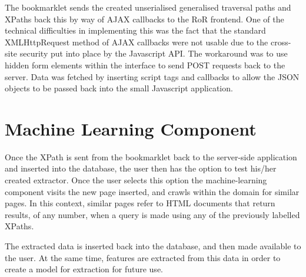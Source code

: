 The bookmarklet sends the created unserialised generalised traversal paths and XPaths back this by way of AJAX callbacks to the RoR frontend. One of the technical difficulties in implementing this was the fact that the standard XMLHttpRequest method of AJAX callbacks were not usable due to the cross-site security put into place by the Javascript API. The workaround was to use hidden form elements within the interface to send POST requests back to the server. Data was fetched by inserting script tags and callbacks to allow the JSON objects to be passed back into the small Javascript application.

\section{Machine Learning Component}
Once the XPath is sent from the bookmarklet back to the server-side application and inserted into the database, the user then has the option to test his/her created extractor. Once the user selects this option the machine-learning component visits the new page inserted, and crawls within the domain for similar pages. In this context, similar pages refer to HTML documents that return results, of any number, when a query is made using any of the previously labelled XPaths. 



	The extracted data is inserted back into the database, and then made available to the user. At the same time, features are extracted from this data in order to create a model for extraction for future use.
	
	